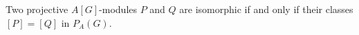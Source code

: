 Two projective $A[G]$-modules $P$ and $Q$ are isomorphic if and only if their classes $[P] = [Q]$ in $P_A(G)$.

